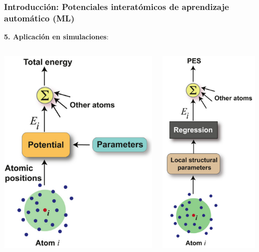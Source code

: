 \documentclass[aspectratio=169]{beamer}
\let\oldtextbf\textbf
\renewcommand{\textbf}[1]{\textcolor{nordblue}{\oldtextbf{#1}}}
\begin{document}
    \begin{frame}
        \frametitle{Introducción: Potenciales interatómicos de aprendizaje 
        automático (ML)}
        
        \textbf{5. Aplicación en simulaciones}:

        \begin{columns}
            \begin{center}
                \includegraphics[width=0.5\columnwidth]{intro-ff.png}
            \end{center}
            \begin{center}
                \includegraphics[width=0.3\columnwidth]{intro-ml.png}
            \end{center}
        \end{columns}

	\end{frame}
\end{document}
